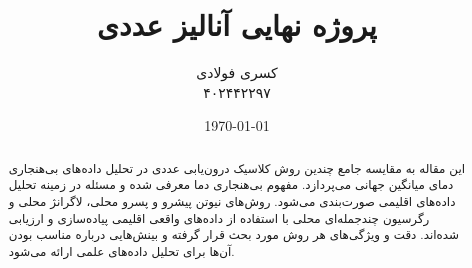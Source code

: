 \documentclass{article}
\title{پروژه نهایی آنالیز عددی}
\author{کسری فولادی \\ ۴۰۲۴۴۲۲۹۷}
\date{\today}
\begin{document}
\maketitle

\small

\begin{abstract}
این مقاله به مقایسه جامع چندین روش کلاسیک درون‌یابی عددی در تحلیل داده‌های بی‌هنجاری دمای میانگین جهانی می‌پردازد. مفهوم بی‌هنجاری دما معرفی شده و مسئله در زمینه تحلیل داده‌های اقلیمی صورت‌بندی می‌شود. روش‌های نیوتن پیشرو و پسرو محلی، لاگرانژ محلی و رگرسیون چندجمله‌ای محلی با استفاده از داده‌های واقعی اقلیمی پیاده‌سازی و ارزیابی شده‌اند. دقت و ویژگی‌های هر روش مورد بحث قرار گرفته و بینش‌هایی درباره مناسب بودن آن‌ها برای تحلیل داده‌های علمی ارائه می‌شود.
\end{abstract}









\end{document}
